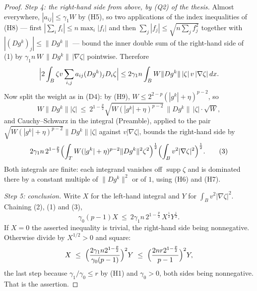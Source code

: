 \begin{proof}
\emph{Step 4: the right-hand side from above, by (Q2) of the thesis.}  Almost
everywhere, $|a_{ij}|\le\gamma_1W$ by (H5), so two applications of the index
inequalities of (H8) --- first $|\sum_i f_i|\le n\max_i|f_i|$ and then
$\sum_j|f_j|\le\sqrt{n\sum_jf_j^2}$ together with $|(Dg^k)_j|\le\|Dg^k\|$ ---
bound the inner double sum of the right-hand side of (1) by
$\gamma_1n\,W\,\|Dg^k\|\,|\nabla\zeta|$ pointwise.  Therefore
\[
\Bigl|2\int_B\zeta v\sum_{i,j}a_{ij}(Dg^k)_jD_i\zeta\Bigr|
\le2\gamma_1n\int_BW\|Dg^k\|\,|\zeta|\,v\,|\nabla\zeta|\,dx .
\]
Now split the weight as in (D4): by (H9), $W\le2^{2-p}(|g^k|+\eta)^{p-2}$, so
\[
W\|Dg^k\||\zeta|
\ \le\ 2^{1-\frac p2}\sqrt{W(|g^k|+\eta)^{p-2}}\,\|Dg^k\|\,|\zeta|\cdot\sqrt W ,
\]
and Cauchy--Schwarz in the integral (Preamble), applied to the pair
$\sqrt{W(|g^k|+\eta)^{p-2}}\|Dg^k\||\zeta|$ against $v|\nabla\zeta|$, bounds the
right-hand side by
\[
2\gamma_1n\,2^{1-\frac p2}
\Bigl(\int_TW(|g^k|+\eta)^{p-2}\|Dg^k\|^2\zeta^2\Bigr)^{\frac12}
\Bigl(\int_Bv^2|\nabla\zeta|^2\Bigr)^{\frac12}.
\tag{3}
\]
Both integrals are finite: each integrand vanishes off $\operatorname{supp}\zeta$
and is dominated there by a constant multiple of $\|Dg^k\|^2$ or of $1$, using
(H6) and (H7).

\emph{Step 5: conclusion.}  Write $X$ for the left-hand integral and $Y$ for
$\int_Bv^2|\nabla\zeta|^2$.  Chaining (2), (1) and (3),
\[
\gamma_0(p-1)X\ \le\ 2\gamma_1n\,2^{1-\frac p2}\,X^{\frac12}Y^{\frac12}.
\]
If $X=0$ the asserted inequality is trivial, the right-hand side being
nonnegative.  Otherwise divide by $X^{1/2}>0$ and square:
\[
X\ \le\ \Bigl(\frac{2\gamma_1n2^{1-\frac p2}}{\gamma_0(p-1)}\Bigr)^{2}Y
\ \le\ \Bigl(\frac{2nr2^{1-\frac p2}}{p-1}\Bigr)^{2}Y ,
\]
the last step because $\gamma_1/\gamma_0\le r$ by (H1) and $\gamma_0>0$, both
sides being nonnegative.  That is the assertion.
\end{proof}
